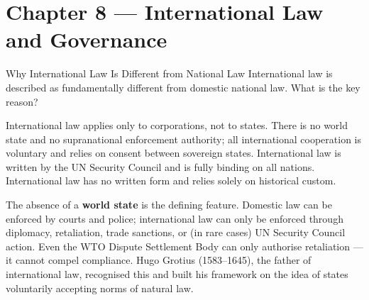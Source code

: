 \documentclass[paper=a5]{scrartcl}
\begin{document}
\section{Chapter 8 — International Law and Governance}

\begin{question}[type=mc]{Why International Law Is Different from National Law}
International law is described as fundamentally different from domestic
national law. What is the key reason?
\begin{choices}
  \choice        International law applies only to corporations, not to states.
  \correctchoice There is no world state and no supranational enforcement
                 authority; all international cooperation is voluntary and
                 relies on consent between sovereign states.
  \choice        International law is written by the UN Security Council and
                 is fully binding on all nations.
  \choice        International law has no written form and relies solely on
                 historical custom.
\end{choices}
\begin{solution}
  The absence of a \textbf{world state} is the defining feature. Domestic law
  can be enforced by courts and police; international law can only be enforced
  through diplomacy, retaliation, trade sanctions, or (in rare cases) UN
  Security Council action. Even the WTO Dispute Settlement Body can only
  authorise retaliation --- it cannot compel compliance. Hugo Grotius
  (1583--1645), the father of international law, recognised this and built his
  framework on the idea of states voluntarily accepting norms of natural law.
\end{solution}
\end{question}
\end{document}
